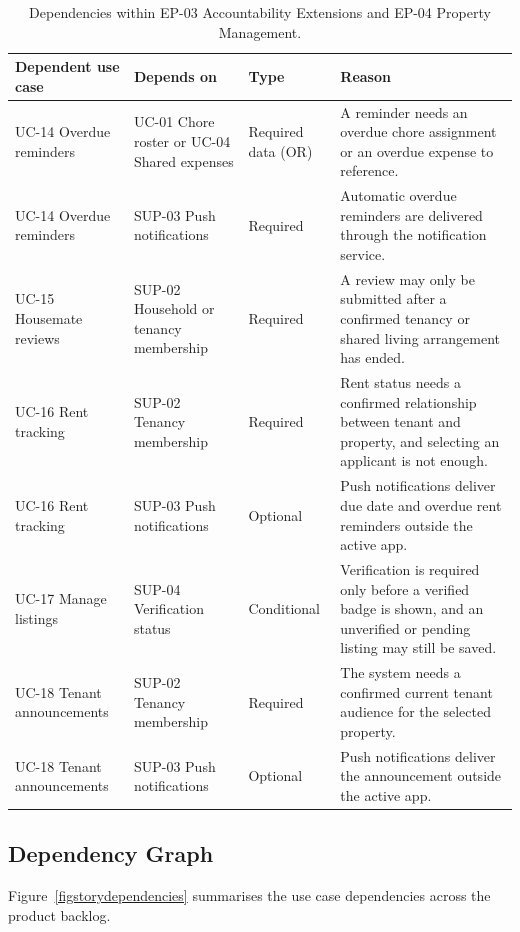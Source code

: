 \documentclass[11pt,a4paper]{article}
\begin{document}
\begin{table}[H]
    \centering
    \small
    \caption{Dependencies within EP-03 Accountability Extensions and EP-04 Property Management.}
    \begin{tabularx}{\textwidth}{@{}L{2.9cm}L{3.3cm}L{2.1cm}Y@{}}
        \toprule
        Dependent use case & Depends on & Type & Reason\\
        \midrule
        UC-14 Overdue reminders & UC-01 Chore roster or UC-04 Shared expenses & Required data (OR) & A reminder needs an overdue chore assignment or an overdue expense to reference.\\
        UC-14 Overdue reminders & SUP-03 Push notifications & Required & Automatic overdue reminders are delivered through the notification service.\\
        UC-15 Housemate reviews & SUP-02 Household or tenancy membership & Required & A review may only be submitted after a confirmed tenancy or shared living arrangement has ended.\\
        UC-16 Rent tracking & SUP-02 Tenancy membership & Required & Rent status needs a confirmed relationship between tenant and property, and selecting an applicant is not enough.\\
        UC-16 Rent tracking & SUP-03 Push notifications & Optional & Push notifications deliver due date and overdue rent reminders outside the active app.\\
        UC-17 Manage listings & SUP-04 Verification status & Conditional & Verification is required only before a verified badge is shown, and an unverified or pending listing may still be saved.\\
        UC-18 Tenant announcements & SUP-02 Tenancy membership & Required & The system needs a confirmed current tenant audience for the selected property.\\
        UC-18 Tenant announcements & SUP-03 Push notifications & Optional & Push notifications deliver the announcement outside the active app.\\
        \bottomrule
    \end{tabularx}
    \label{tabdepsextension}
\end{table}

\subsection{Dependency Graph}

Figure~\ref{figstorydependencies} summarises the use case dependencies across the product backlog.
\end{document}
